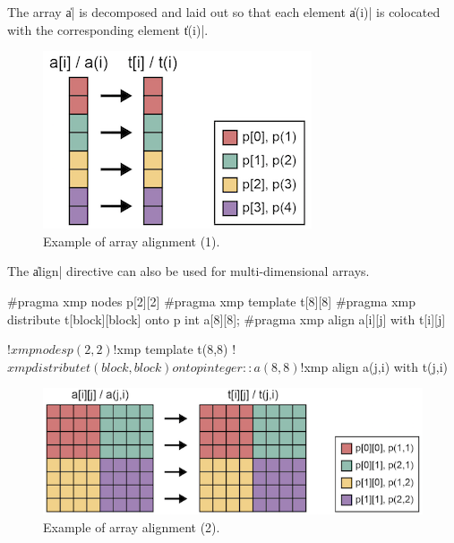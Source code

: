 The array \|a| is decomposed and laid out so that each element
\|a(i)| is colocated with the corresponding {\template} element \|t(i)|.


\begin{figure}
  \centering
  \includegraphics{figs/1dim.png}
  \caption{Example of array alignment (1).}
\end{figure}

The \|align| directive can also be used for multi-dimensional arrays.

\begin{XCexample}
#pragma xmp nodes p[2][2]
#pragma xmp template t[8][8]
#pragma xmp distribute t[block][block] onto p
int a[8][8];
#pragma xmp align a[i][j] with t[i][j]
\end{XCexample}

\begin{XFexample}
!$xmp nodes p(2,2)
!$xmp template t(8,8)
!$xmp distribute t(block,block) onto p
integer :: a(8,8)
!$xmp align a(j,i) with t(j,i)
\end{XFexample}

\begin{figure}
  \centering
  \includegraphics{figs/multi-dim.png}
  \caption{Example of array alignment (2).}
\end{figure}


